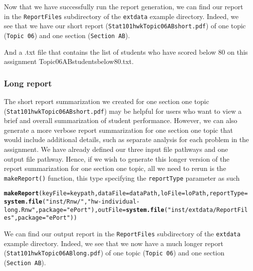 \documentclass{article}\usepackage[]{graphicx}\usepackage[]{color}
\makeatletter
\newcommand{\hlstr}[1]{\textcolor[rgb]{0.192,0.494,0.8}{#1}}%
\newcommand{\hlstd}[1]{\textcolor[rgb]{0.345,0.345,0.345}{#1}}%
\newcommand{\hlkwc}[1]{\textcolor[rgb]{0.333,0.667,0.333}{#1}}%
\newcommand{\hlkwd}[1]{\textcolor[rgb]{0.737,0.353,0.396}{\textbf{#1}}}%
\newenvironment{kframe}{%
 \def\at@end@of@kframe{}%
 \ifinner\ifhmode%
  \def\at@end@of@kframe{\end{minipage}}%
  \begin{minipage}{\columnwidth}%
 \fi\fi%
 \def\FrameCommand##1{\hskip\@totalleftmargin \hskip-\fboxsep
 \colorbox{shadecolor}{##1}\hskip-\fboxsep
     \hskip-\linewidth \hskip-\@totalleftmargin \hskip\columnwidth}%
 \MakeFramed {\advance\hsize-\width
   \@totalleftmargin\z@ \linewidth\hsize
   \@setminipage}}%
 {\par\unskip\endMakeFramed%
 \at@end@of@kframe}
\newenvironment{knitrout}{}{} %
\numberwithin{equation}{section} %
\makeatother
\begin{document}
Now that we have successfully run the report generation, we can find our report in the \texttt{ReportFiles} subdirectory of the \texttt{extdata} example directory. Indeed, we see that we have our short report (\texttt{Stat101hwkTopic06ABshort.pdf}) of one topic (\texttt{Topic 06}) and one section (\texttt{Section AB}).

And a .txt file that contains the list of students who have scored below 80 on this assignment {Topic06ABstudentsbelow80.txt}.

\subsubsection{Long report}

The short report summarization we created for one section one topic (\texttt{Stat101hwkTopic06ABshort.pdf}) may be helpful for users who want to view a brief and overall summarization of student performance. However, we can also generate a more verbose report summarization for one section one topic that would include additional details, such as separate analysis for each problem in the assignment. We have already defined our three input file pathways and one output file pathway. Hence, if we wish to generate this longer version of the report summarization for one section one topic, all we need to rerun is the \texttt{makeReport()} function, this type specifying the \texttt{reportType} parameter as such%

\begin{knitrout}
\color{fgcolor}\begin{kframe}
\begin{alltt}
\hlkwd{makeReport}\hlstd{(}\hlkwc{keyFile}\hlstd{=keypath,}\hlkwc{dataFile}\hlstd{=dataPath,}\hlkwc{loFile}\hlstd{=loPath,}\hlkwc{reportType}\hlstd{=}\hlkwd{system.file}\hlstd{(}\hlstr{"inst/Rnw/"}\hlstd{,} \hlstr{"hw-individual-long.Rnw"}\hlstd{,} \hlkwc{package}\hlstd{=}\hlstr{"ePort"}\hlstd{),}\hlkwc{outFile}\hlstd{=}\hlkwd{system.file}\hlstd{(}\hlstr{"inst/extdata/ReportFiles"}\hlstd{,} \hlkwc{package}\hlstd{=}\hlstr{"ePort"}\hlstd{))}
\end{alltt}
\end{kframe}
\end{knitrout}

We can find our output report in the \texttt{ReportFiles} subdirectory of the \texttt{extdata} example directory. Indeed, we see that we now have a much longer report (\texttt{Stat101hwkTopic06ABlong.pdf}) of one topic (\texttt{Topic 06}) and one section (\texttt{Section AB}).
\end{document}
